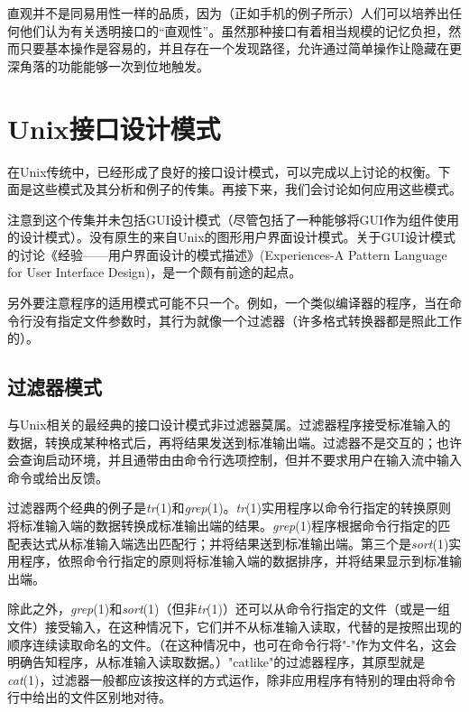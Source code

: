 \documentclass[12pt,oneside]{book}
\begin{document}
\begin{common-format}
直观并不是同易用性一样的品质，因为（正如手机的例子所示）人们可以培养出任何他们认为有关透明接口的“直观性”。虽然那种接口有着相当规模的记忆负担，然而只要基本操作是容易的，并且存在一个发现路径，允许通过简单操作让隐藏在更深角落的功能能够一次到位地触发。

\section{Unix接口设计模式}
在Unix传统中，已经形成了良好的接口设计模式，可以完成以上讨论的权衡。下面是这些模式及其分析和例子的传集。再接下来，我们会讨论如何应用这些模式。

注意到这个传集并未包括GUI设计模式（尽管包括了一种能够将GUI作为组件使用的设计模式）。没有原生的来自Unix的图形用户界面设计模式。关于GUI设计模式的讨论《经验——用户界面设计的模式描述》(Experiences-A Pattern Language for User Interface Design)\cite{Coram-Lee}，是一个颇有前途的起点。

另外要注意程序的适用模式可能不只一个。例如，一个类似编译器的程序，当在命令行没有指定文件参数时，其行为就像一个过滤器（许多格式转换器都是照此工作的）。

\subsection{过滤器模式}
与Unix相关的最经典的接口设计模式非过滤器莫属。过滤器程序接受标准输入的数据，转换成某种格式后，再将结果发送到标准输出端。过滤器不是交互的；也许会查询启动环境，并且通带由由命令行选项控制，但并不要求用户在输入流中输入命令或给出反馈。

过滤器两个经典的例子是\textit{tr}(1)和\textit{grep}(1)。\textit{tr}(1)实用程序以命令行指定的转换原则将标准输入端的数据转换成标准输出端的结果。\textit{grep}(1)程序根据命令行指定的匹配表达式从标准输入端选出匹配行；并将结果送到标准输出端。第三个是\textit{sort}(1)实用程序，依照命令行指定的原则将标准输入端的数据排序，并将结果显示到标准输出端。

除此之外，\textit{grep}(1)和\textit{sort}(1)（但非\textit{tr}(1)）还可以从命令行指定的文件（或是一组文件）接受输入，在这种情况下，它们并不从标准输入读取，代替的是按照出现的顺序连续读取命名的文件。（在这种情况中，也可在命令行将"-"作为文件名，这会明确告知程序，从标准输入读取数据。）"catlike"的过滤器程序，其原型就是\textit{cat}(1)，过滤器一般都应该按这样的方式运作，除非应用程序有特别的理由将命令行中给出的文件区别地对待。


\end{common-format}
\end{document}

